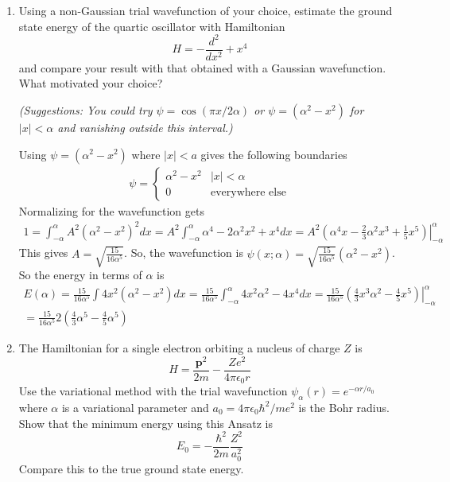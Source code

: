 \documentclass[10pt,letterpaper]{article}
\begin{document}
\begin{enumerate}
\item Using a non-Gaussian trial wavefunction of your choice, estimate the ground state energy of the quartic oscillator with Hamiltonian
$$H = -\frac{d^{2}}{dx^{2}} + x^{4}$$
and compare your result with that obtained with a Gaussian wavefunction. What motivated your choice?

\textit{(Suggestions: You could try $\psi = \cos(\pi x/2\alpha)$ or $\psi = (\alpha^{2} - x^{2})$ for $|x| < \alpha$ and vanishing outside this interval.)}

\color{violet}
Using $\psi = (\alpha^{2} - x^{2})$ where $|x| < a$ gives the following boundaries
\begin{gather*}
\psi = \begin{cases}
\alpha^{2} - x^{2} & |x| < \alpha \\
0 & \text{everywhere else}
\end{cases}
\end{gather*}
Normalizing for the wavefunction gets
\begin{gather*}
1 = \int_{-\alpha}^{\alpha} A^{2}(\alpha^{2} - x^{2})^{2} dx = A^{2} \int_{-\alpha}^{\alpha} \alpha^{4} - 2\alpha^{2}x^{2} + x^{4} dx = A^{2} \left. \left( \alpha^{4}x - \frac{2}{3}\alpha^{2}x^{3} + \frac{1}{5}x^{5} \right) \right|_{-\alpha}^{\alpha}
\end{gather*}
This gives $A = \sqrt{\frac{15}{16\alpha^{5}}}$. So, the wavefunction is $\psi(x; \alpha) = \sqrt{\frac{15}{16\alpha^{5}}} (\alpha^{2} - x^{2})$. So the energy in terms of $\alpha$ is
\begin{gather*}
E(\alpha) = \frac{15}{16\alpha^{5}} \int 4x^{2} (\alpha^{2} - x^{2}) dx = \frac{15}{16\alpha^{5}} \int_{-\alpha}^{\alpha} 4x^{2}\alpha^{2} - 4x^{4} dx = \frac{15}{16\alpha^{5}} \left. \left( \frac{4}{3}x^{3}\alpha^{2} - \frac{4}{5}x^{5} \right) \right|_{-\alpha}^{\alpha} \\
= \frac{15}{16\alpha^{5}} 2\left( \frac{4}{3}\alpha^{5} - \frac{4}{5}\alpha^{5} \right)
\end{gather*}
\color{black}

\item The Hamiltonian for a single electron orbiting a nucleus of charge $Z$ is
$$H = \frac{\textbf{p}^{2}}{2m} - \frac{Ze^{2}}{4\pi\epsilon_{0}r}$$
Use the variational method with the trial wavefunction $\psi_{\alpha}(r) = e^{-\alpha r/a_{0}}$ where $\alpha$ is a variational parameter and $a_{0} = 4\pi\epsilon_{0}\hbar^{2}/me^{2}$ is the Bohr radius. Show that the minimum energy using this Ansatz is
$$E_{0} = -\frac{\hbar^{2}}{2m} \frac{Z^{2}}{a_{0}^{2}}$$
Compare this to the true ground state energy. 

\color{violet}

\color{black}

\end{enumerate}
\end{document}
